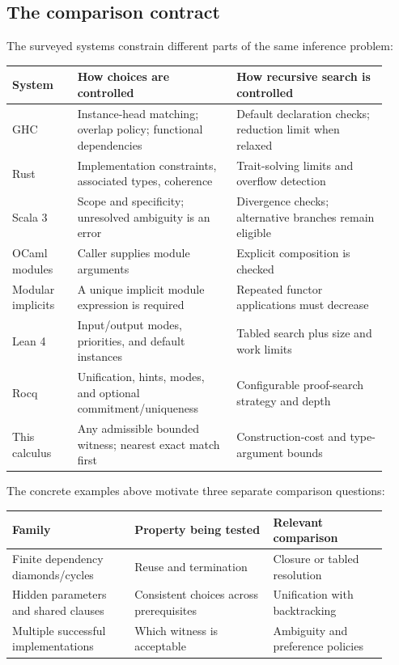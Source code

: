 \documentclass[10pt,a4paper]{article}
\begin{document}
\subsection{The comparison contract}
The surveyed systems constrain different parts of the same inference problem:
\begin{center}
\begin{tabular}{@{}
 >{\raggedright\arraybackslash}p{0.16\linewidth}
 >{\raggedright\arraybackslash}p{0.39\linewidth}
 >{\raggedright\arraybackslash}p{0.37\linewidth}@{}}
\toprule
System & How choices are controlled & How recursive search is controlled\\
\midrule
GHC
  & Instance-head matching; overlap policy; functional dependencies
  & Default declaration checks; reduction limit when relaxed\\[4pt]
Rust
  & Implementation constraints, associated types, coherence
  & Trait-solving limits and overflow detection\\[4pt]
Scala 3
  & Scope and specificity; unresolved ambiguity is an error
  & Divergence checks; alternative branches remain eligible\\[4pt]
OCaml modules
  & Caller supplies module arguments
  & Explicit composition is checked\\[4pt]
Modular implicits
  & A unique implicit module expression is required
  & Repeated functor applications must decrease\\[4pt]
Lean 4
  & Input/output modes, priorities, and default instances
  & Tabled search plus size and work limits\\[4pt]
Rocq
  & Unification, hints, modes, and optional commitment/uniqueness
  & Configurable proof-search strategy and depth\\[4pt]
This calculus
  & Any admissible bounded witness; nearest exact match first
  & Construction-cost and type-argument bounds\\
\bottomrule
\end{tabular}
\end{center}
The concrete examples above motivate three separate comparison questions:
\begin{center}
\begin{tabular}{@{}
 >{\raggedright\arraybackslash}p{0.30\linewidth}
 >{\raggedright\arraybackslash}p{0.34\linewidth}
 >{\raggedright\arraybackslash}p{0.28\linewidth}@{}}
\toprule
Family & Property being tested & Relevant comparison\\
\midrule
Finite dependency diamonds/cycles
  & Reuse and termination & Closure or tabled resolution\\[4pt]
Hidden parameters and shared clauses
  & Consistent choices across prerequisites & Unification with backtracking\\[4pt]
Multiple successful implementations
  & Which witness is acceptable & Ambiguity and preference policies\\
\bottomrule
\end{tabular}
\end{center}
\end{document}
